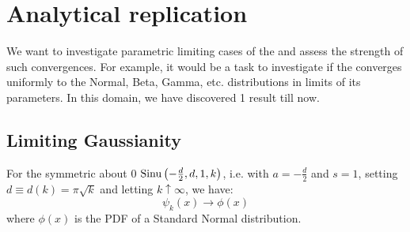 \section{Analytical replication}
We want to investigate parametric limiting cases of the \sindist{} and assess the strength of such convergences. For example, it would be a task to investigate if the \sindist{} converges uniformly to the Normal, Beta, Gamma, etc. distributions in limits of its parameters. In this domain, we have discovered 1 result till now.
\subsection{Limiting Gaussianity}
\begin{thm}\label{thm:normality}
	For the symmetric about 0 \sindist{} $\operatorname*{Sinu}\left(-\frac{d}{2}, d, 1, k\right)$, i.e. with $a = -\frac{d}{2}$ and $s=1$, setting $d \equiv d(k)= \pi \sqrt k$ and letting $k \uparrow \infty$, we have:
	\[ \psi_k(x) \to \phi(x)\]
	where $\phi(x)$ is the PDF of a Standard Normal distribution.
\end{thm}

